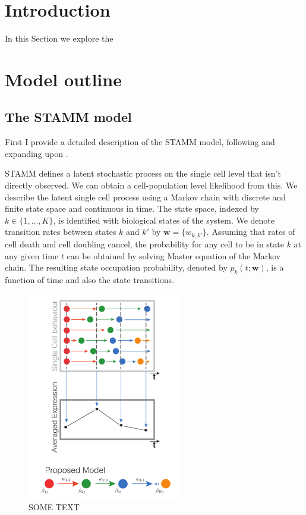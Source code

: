 
\section{Introduction}
\label{sec:intro-stamm}


In this Section we explore the 

\section{Model outline}
\label{sec:method}

\subsection{The STAMM model}
\label{sec:mast-model}


First I provide a detailed description of the STAMM model, following and expanding upon  
\cite{Armond:2013}.

STAMM defines a latent stochastic process on the single cell level that isn't directly observed. We can obtain a cell-population level likelihood from this. We describe the latent single cell process using a Markov chain with discrete and finite state space and continuous in time. The state space, indexed by $k \in \lbrace 1, ..., K \rbrace$, is identified with biological states of the system. We denote transition rates between states $k$ and $k'$ by $\mathbf{w} = \lbrace w_{k,k'} \rbrace $. Assuming that rates of cell death and cell doubling cancel, the probability for any cell to be in state $k$ at any given time $t$ can be obtained by solving Master equation of the Markov chain. The resulting state occupation probability, denoted by $p_k(t;\mathbf{w})$, is a function of time and also the state transitions.

\begin{figure}[h]
  \centering
  \includegraphics[width=0.6\textwidth]{pics/model_fig.pdf}
  \caption{SOME TEXT}
  \label{fig:model-sketch}
\end{figure}

